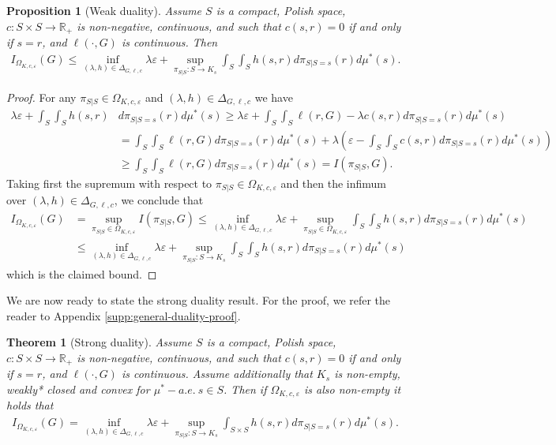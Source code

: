 \documentclass{article}
\newcommand{\R}{\mathbb{R}} %
\newcommand{\Okc}{\Omega_{K, c, \varepsilon}}
\newcommand{\D}{\Delta_{G,\ell, c}}
\newtheorem{theorem}{Theorem}[section]
\newtheorem{proposition}{Proposition}[section]
\theoremstyle{definition}
\theoremstyle{remarksty}
\begin{document}
\begin{proposition}[Weak duality]\label{prop:weakduality}
    Assume $S$ is a compact, Polish space, $c: S \times S \to \R_+$ is non-negative, continuous, and such that $c(s,r) = 0$ if and only if $s=r$, and $\ell(\cdot,G)$ is continuous. Then
    \begin{align*}
        I_{\Okc} (G)\leq \inf_{(\lambda, h) \in \D} \lambda \varepsilon + \sup_{\pi_{S|S} : S \rightarrow K_s} \int_S\int_S h(s,r) d\pi_{S|S=s}(r)d\mu^*(s).
    \end{align*}
\end{proposition}
\begin{proof}
    For any $\pi_{S|S} \in \Okc$ and $(\lambda, h) \in \D$ we have
    \begin{align*}
        \lambda \varepsilon + \int_S\int_S h(s,r) & d\pi_{S|S=s}(r)d\mu^*(s) \geq \lambda \varepsilon + \int_S\int_S \ell(r, G) - \lambda c(s,r) d\pi_{S|S=s}(r)d\mu^*(s) \\
        &= \int_S\int_S \ell(r, G)d\pi_{S|S=s}(r)d\mu^*(s) + \lambda \left(\varepsilon - \int_S\int_S c(s,r)d\pi_{S|S=s}(r)d\mu^*(s) \right) \\
        &\geq \int_S\int_S\ell(r, G) d\pi_{S|S=s}(r)d\mu^*(s) = I(\pi_{S|S}, G).
    \end{align*}
    Taking first the supremum with respect to $\pi_{S|S} \in \Okc$ and then the infimum over $(\lambda, h) \in \D$, we conclude that
    \begin{align*}
        I_{\Okc} (G) & = \sup_{\pi_{S|S} \in \Okc} I(\pi_{S|S}, G) \leq 
        \inf_{(\lambda, h) \in \D}  \lambda \varepsilon + \sup_{\pi_{S|S}\in \Okc} \int_S\int_S h(s,r) d\pi_{S|S=s}(r)d\mu^*(s) \\
        & \leq \inf_{(\lambda, h) \in \D}  \lambda \varepsilon + \sup_{\pi_{S|S} : S\rightarrow K_s} \int_S\int_S h(s,r) d\pi_{S|S=s}(r)d\mu^*(s)
    \end{align*}
    which is the claimed bound.
\end{proof}

We are now ready to state the strong duality result. For the proof, we refer the reader to Appendix \ref{supp:general-duality-proof}.

\begin{theorem}[Strong duality]\label{thm:w-padro-strong-duality}
    Assume $S$ is a compact, Polish space, $c: S \times S \to \R_+$ is non-negative, continuous, and such that $c(s,r) = 0$ if and only if $s=r$, and $\ell(\cdot,G)$ is continuous. Assume additionally that $K_s$ is non-empty, weakly* closed and convex for $\mu^*-a.e.\ s \in S$. Then if $\Omega_{K,c,\varepsilon}$ is also non-empty it holds that 
    \begin{align*}
            I_{\Okc} (G) = \inf_{(\lambda, h) \in \D} \lambda \varepsilon + \sup_{\pi_{S|S} : S \to K_s} \int_{S \times S} h(s,r) d\pi_{S|S=s}(r)d\mu^*(s).
        \end{align*}
\end{theorem}
\end{document}
